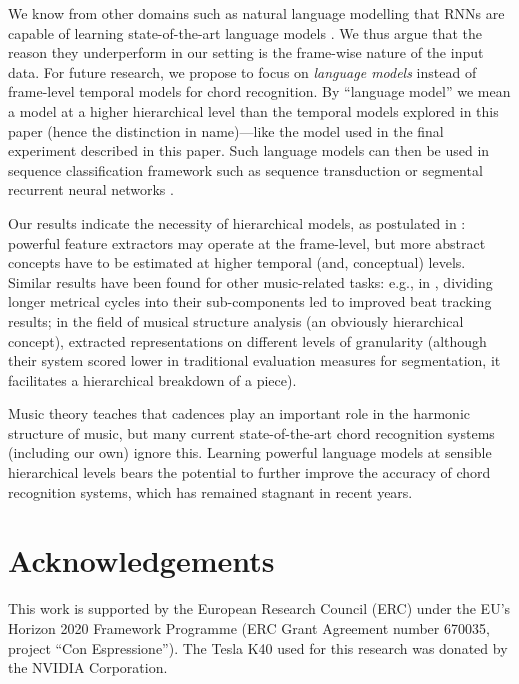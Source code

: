 \documentclass[twocolumn]{article}
\begin{document}
We know from other domains such as natural language modelling that RNNs are
capable of learning state-of-the-art language models
\cite{mikolov_recurrent_2010}. We thus argue that the reason they underperform
in our setting is the frame-wise nature of the input data. For future research,
we propose to focus on \emph{language models} instead of frame-level temporal
models for chord recognition. By ``language model'' we mean a model at a higher
hierarchical level than the temporal models explored in this paper (hence the
distinction in name)---like the model used in the final experiment described in
this paper. Such language models can then be used in sequence classification
framework such as sequence transduction \cite{graves_sequence_2012} or
segmental recurrent neural networks \cite{lu_segmental_2016}.

Our results indicate the necessity of hierarchical models, as postulated in
\cite{widmer_getting_2016a}: powerful feature extractors may operate at the
frame-level, but more abstract concepts have to be estimated at higher temporal
(and, conceptual) levels. Similar results have been found for other
music-related tasks: e.g., in \cite{srinivasamurthy_generalized_2016},
dividing longer metrical cycles into their sub-components led to improved beat
tracking results; in the field of musical structure analysis (an obviously
hierarchical concept), \cite{mcfee_analyzing_2014} extracted representations
on different levels of granularity (although their system scored lower in
traditional evaluation measures for segmentation, it facilitates a hierarchical
breakdown of a piece).

Music theory teaches that cadences play an important role in the harmonic
structure of music, but many current state-of-the-art chord recognition systems
(including our own) ignore this. Learning powerful language models at sensible
hierarchical levels bears the potential to further improve the accuracy of
chord recognition systems, which has remained stagnant in recent years.

\section*{Acknowledgements}

This work is supported by the European Research Council (ERC) under the EU’s
Horizon 2020 Framework Programme (ERC Grant Agreement number 670035, project
``Con Espressione''). The Tesla K40 used for this research was donated by the
NVIDIA Corporation.




\end{document}
